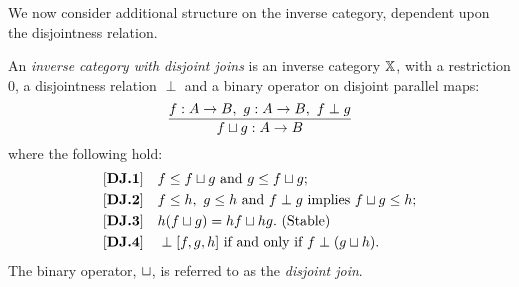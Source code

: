 We now consider additional structure on the inverse category, dependent upon the disjointness
relation.
\begin{definition}\label{def:disjoint_join}
  An \emph{inverse category with disjoint joins} is an inverse category $\mathbb{X}$, with a restriction
  $0$, a disjointness relation $\perp$ and a binary operator on disjoint parallel maps:
  \[
    \infer{f \djoin g : A \to B}{f: A\to B,\ g: A\to B,\ f \perp g}
  \]
  where the following hold:
  \begin{align*}
    \axiom{DJ}{1}\quad & f \le f \djoin g\text{ and }g \le f \djoin g; \\
    \axiom{DJ}{2}\quad & f \le h,\ g \le h\text{ and }f\perp g\text{ implies }f \djoin g \le h;\\
    \axiom{DJ}{3}\quad & h(f \djoin g) = h f \djoin h g. \text{ (Stable)} \\
    \axiom{DJ}{4}\quad & \cdperp [f, g, h]\text{ if and only if }f \perp (g\djoin h).\\
  \end{align*}
  The binary operator, $\sqcup$, is referred to as the \emph{disjoint join}.
\end{definition}

